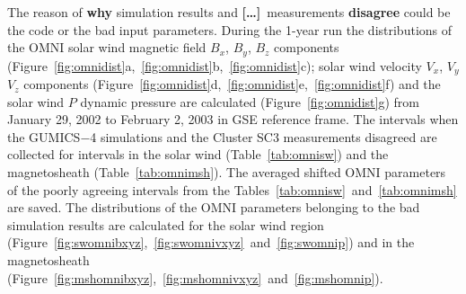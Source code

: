 \documentclass[linenumbers,draft]{agujournal}
\newcommand{\del}{\textbf{[\dots]}\ } %
\begin{document}
The reason of \textbf{why} simulation results and \del measurements \textbf{disagree} could be the code or the bad input parameters. During the 1-year run the distributions of the OMNI solar wind magnetic field $B_{x}$, $B_{y}$, $B_{z}$ components (Figure~\ref{fig:omnidist}a,~\ref{fig:omnidist}b,~\ref{fig:omnidist}c); solar wind velocity $V_{x}$, $V_{y}$ $V_{z}$ components (Figure~\ref{fig:omnidist}d,~\ref{fig:omnidist}e,~\ref{fig:omnidist}f) and the solar wind $P$ dynamic pressure are calculated (Figure~\ref{fig:omnidist}g) from January 29, 2002 to February 2, 2003 in GSE reference frame. The intervals when the GUMICS$-$4 simulations and the Cluster SC3 measurements disagreed are collected for intervals in the solar wind (Table~\ref{tab:omnisw}) and the magnetosheath (Table~\ref{tab:omnimsh}). The averaged shifted OMNI parameters of the poorly agreeing intervals from the Tables~\ref{tab:omnisw}~and~\ref{tab:omnimsh} are saved. The distributions of the OMNI parameters belonging to the bad simulation results are calculated for the solar wind region (Figure~\ref{fig:swomnibxyz},~\ref{fig:swomnivxyz}~and~\ref{fig:swomnip}) and in the magnetosheath (Figure~\ref{fig:mshomnibxyz},~\ref{fig:mshomnivxyz}~and~\ref{fig:mshomnip}).
\end{document}
